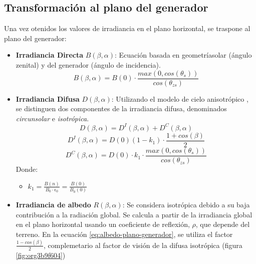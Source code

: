 \subsection{Transformación al plano del generador}
\label{sec:org917378c}
\label{subsec:transformación-plano-generador}
Una vez otenidos los valores de irradiancia en el plano horizontal, se traspone al plano del generador:
\begin{itemize}
\item \textbf{Irradiancia Directa} \(B(\beta ,\alpha)\): Ecuación basada en geometríasolar (ángulo zenital) y del generador (ángulo de incidencia).
\begin{equation}
B(\beta ,\alpha)=B(0)\cdot \frac{max(0,cos(\theta_s))}{cos(\theta_{zs})}
\label{eq:irradiancia-directa-plano-generador}
\end{equation}
\item \textbf{Irradiancia Difusa} \(D(\beta ,\alpha)\): Utilizando el modelo de cielo anisotrópico \cite{Perpinan2023}, se distinguen dos componentes de la irradiancia difusa, denominados \emph{circunsolar} e \emph{isotrópica}.  
\begin{equation}
D(\beta ,\alpha)=D^I(\beta ,\alpha)+D^C(\beta ,\alpha)
\end{equation}
\begin{equation}
D^I(\beta ,\alpha)=D(0)(1-k_1)\cdot \frac{1+cos(\beta)}{2}
\end{equation}
\begin{equation}
D^C(\beta, \alpha)=D(0)\cdot k_1\cdot \frac{max(0,cos(\theta_s))}{cos(\theta_{zs})}
\end{equation}
Donde:
\begin{itemize}
\item \(k_1=\frac{B(n)}{B_0\cdot \epsilon_0}=\frac{B(0)}{B_0(0)}\)
\end{itemize}
\item \textbf{Irradiancia de albedo} \(R(\beta ,\alpha)\): Se considera isotrópica debido a su baja contribución a la radiación global. Se calcula a partir de la irradiancia global en el plano horizontal usando un coeficiente de reflexión, \(\rho\), que depende del terreno. En la ecuación \ref{eq:albedo-plano-generador}, se utiliza el factor \(\frac{1-cos(\beta)}{2}\), complemetario al factor de visión de la difusa isotrópica (figura \ref{fig:org3b9f604})
\begin{equation}

\end{equation}
\end{itemize}
